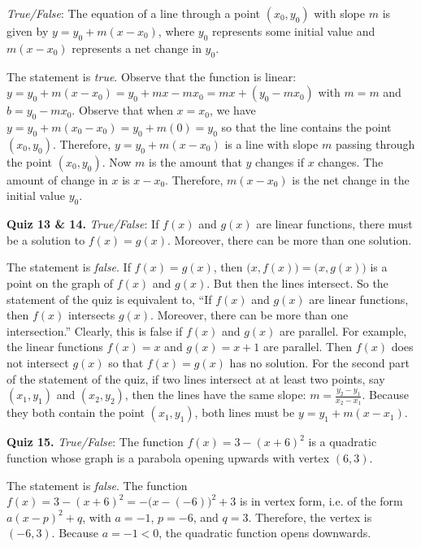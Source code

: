 \documentclass[11pt,letterpaper]{article}
\begin{document}
\quizsol \textit{True/False}: The equation of a line through a point $(x_0, y_0)$ with slope $m$ is given by $y= y_0 + m(x - x_0)$, where $y_0$ represents some initial value and $m(x - x_0)$ represents a net change in $y_0$. \pspace

\sol The statement is \textit{true}. Observe that the function is linear: $y= y_0 + m(x - x_0)= y_0 + mx - mx_0= mx + (y_0 - mx_0)$ with $m= m$ and $b= y_0 - mx_0$. Observe that when $x= x_0$, we have $y= y_0 + m(x_0 - x_0)= y_0 + m(0)= y_0$ so that the line contains the point $(x_0 , y_0)$. Therefore, $y= y_0 + m(x - x_0)$ is a line with slope $m$ passing through the point $(x_0, y_0)$. Now $m$ is the amount that $y$ changes if $x$ changes. The amount of change in $x$ is $x - x_0$. Therefore, $m(x - x_0)$ is the net change in the initial value $y_0$. \pvspace{1.5cm}



\noindent\textbf{Quiz 13 \& 14.} \textit{True/False}: If $f(x)$ and $g(x)$ are linear functions, there must be a solution to $f(x)= g(x)$. Moreover, there can be more than one solution. \phantom{\quizsol\quizsol} \pspace

\sol The statement is \textit{false}. If $f(x)= g(x)$, then $\big(x, f(x) \big)= \big(x, g(x) \big)$ is a point on the graph of $f(x)$ and $g(x)$. But then the lines intersect. So the statement of the quiz is equivalent to, ``If $f(x)$ and $g(x)$ are linear functions, then $f(x)$ intersects $g(x)$. Moreover, there can be more than one intersection.'' Clearly, this is false if $f(x)$ and $g(x)$ are parallel. For example, the linear functions $f(x)= x$ and $g(x)= x + 1$ are parallel. Then $f(x)$ does not intersect $g(x)$ so that $f(x)= g(x)$ has no solution. For the second part of the statement of the quiz, if two lines intersect at at least two points, say $(x_1, y_1)$ and $(x_2, y_2)$, then the lines have the same slope: $m= \frac{y_2 - y_1}{x_2 - x_1}$. Because they both contain the point $(x_1, y_1)$, both lines must be $y= y_1 + m(x - x_1)$. 





\newpage





\noindent\textbf{Quiz 15.} \textit{True/False}: The function $f(x)= 3 - (x + 6)^2$ is a quadratic function whose graph is a parabola opening upwards with vertex $(6, 3)$. \pspace

\sol The statement is \textit{false}. The function $f(x)= 3 - (x + 6)^2= -\big(x - (-6) \big)^2 + 3$ is in vertex form, i.e. of the form $a(x - p)^2 + q$, with $a= -1$, $p= -6$, and $q= 3$. Therefore, the vertex is $(-6, 3)$. Because $a= -1 < 0$, the quadratic function opens downwards. \pvspace{1.5cm}
\end{document}
